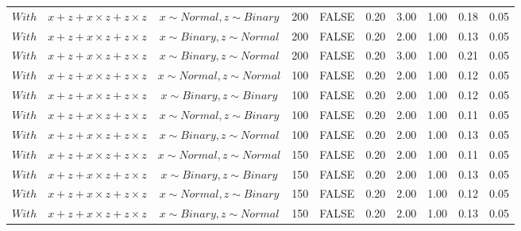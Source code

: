 \begin{longtable}{lccccccccc}
  $With$ & $\textit{x} + \textit{z} + \textit{x} \times \textit{z} + \textit{z} \times \textit{z}$ & $\textit{x} \sim Normal, \textit{z} \sim Binary$ & 200 & FALSE & 0.20 & 3.00 & 1.00 & 0.18 & 0.05 \\ 
  $With$ & $\textit{x} + \textit{z} + \textit{x} \times \textit{z} + \textit{z} \times \textit{z}$ & $\textit{x} \sim Binary, \textit{z} \sim Normal$ & 200 & FALSE & 0.20 & 2.00 & 1.00 & 0.13 & 0.05 \\ 
  $With$ & $\textit{x} + \textit{z} + \textit{x} \times \textit{z} + \textit{z} \times \textit{z}$ & $\textit{x} \sim Binary, \textit{z} \sim Normal$ & 200 & FALSE & 0.20 & 3.00 & 1.00 & 0.21 & 0.05 \\ 
  $With$ & $\textit{x} + \textit{z} + \textit{x} \times \textit{z} + \textit{z} \times \textit{z}$ & $\textit{x} \sim Normal , \textit{z} \sim Normal$ & 100 & FALSE & 0.20 & 2.00 & 1.00 & 0.12 & 0.05 \\ 
  $With$ & $\textit{x} + \textit{z} + \textit{x} \times \textit{z} + \textit{z} \times \textit{z}$ & $\textit{x} \sim Binary, \textit{z} \sim Binary$ & 100 & FALSE & 0.20 & 2.00 & 1.00 & 0.12 & 0.05 \\ 
  $With$ & $\textit{x} + \textit{z} + \textit{x} \times \textit{z} + \textit{z} \times \textit{z}$ & $\textit{x} \sim Normal, \textit{z} \sim Binary$ & 100 & FALSE & 0.20 & 2.00 & 1.00 & 0.11 & 0.05 \\ 
  $With$ & $\textit{x} + \textit{z} + \textit{x} \times \textit{z} + \textit{z} \times \textit{z}$ & $\textit{x} \sim Binary, \textit{z} \sim Normal$ & 100 & FALSE & 0.20 & 2.00 & 1.00 & 0.13 & 0.05 \\ 
  $With$ & $\textit{x} + \textit{z} + \textit{x} \times \textit{z} + \textit{z} \times \textit{z}$ & $\textit{x} \sim Normal , \textit{z} \sim Normal$ & 150 & FALSE & 0.20 & 2.00 & 1.00 & 0.11 & 0.05 \\ 
  $With$ & $\textit{x} + \textit{z} + \textit{x} \times \textit{z} + \textit{z} \times \textit{z}$ & $\textit{x} \sim Binary, \textit{z} \sim Binary$ & 150 & FALSE & 0.20 & 2.00 & 1.00 & 0.13 & 0.05 \\ 
  $With$ & $\textit{x} + \textit{z} + \textit{x} \times \textit{z} + \textit{z} \times \textit{z}$ & $\textit{x} \sim Normal, \textit{z} \sim Binary$ & 150 & FALSE & 0.20 & 2.00 & 1.00 & 0.12 & 0.05 \\ 
  $With$ & $\textit{x} + \textit{z} + \textit{x} \times \textit{z} + \textit{z} \times \textit{z}$ & $\textit{x} \sim Binary, \textit{z} \sim Normal$ & 150 & FALSE & 0.20 & 2.00 & 1.00 & 0.13 & 0.05 \\ 

\end{longtable}
